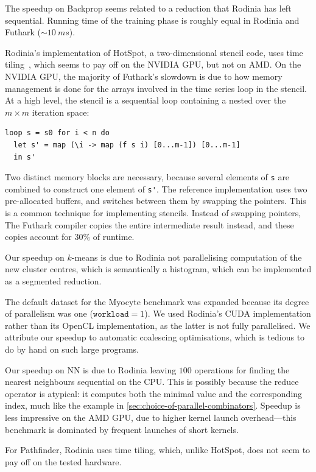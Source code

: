The speedup on Backprop seems related to a reduction that Rodinia has
left sequential.  Running time of the training phase is roughly equal
in Rodinia and Futhark ($\sim10~ms$).

Rodinia's implementation of HotSpot, a two-dimensional stencil code,
uses time tiling~\cite{HexaTiling}, which seems to pay off on the
NVIDIA GPU, but not on AMD.  On the NVIDIA GPU, the majority of
Futhark's slowdown is due to how memory management is done for the
arrays involved in the time series loop in the stencil.  At a high
level, the stencil is a sequential loop containing a nested 
over the $m\times{}m$ iteration space:

\begin{lstlisting}
loop s = s0 for i < n do
  let s' = map (\i -> map (f s i) [0...m-1]) [0...m-1]
  in s'
\end{lstlisting}

Two distinct memory blocks are necessary, because several elements of
\lstinline{s} are combined to construct one element of \lstinline{s'}.
The reference implementation uses two pre-allocated buffers, and
switches between them by swapping the pointers.  This is a common
technique for implementing stencils.  Instead of swapping pointers,
The Futhark compiler copies the entire intermediate result instead,
and these copies account for $30\%$ of runtime.

Our speedup on $k$-means is due to Rodinia not parallelising
computation of the new cluster centres, which is semantically a
histogram, which can be implemented as a segmented reduction.

The default dataset for the Myocyte benchmark was expanded because its
degree of parallelism was one ($\texttt{workload}=1$).  We used
Rodinia's CUDA implementation rather than its OpenCL implementation,
as the latter is not fully parallelised.  We attribute our speedup to
automatic coalescing optimisations, which is tedious to do by hand on
such large programs.

Our speedup on NN is due to Rodinia leaving $100$ 
operations for finding the nearest neighbours sequential on the CPU.
This is possibly because the reduce operator is atypical: it computes
both the minimal value and the corresponding index, much like the
example in \cref{sec:choice-of-parallel-combinators}.  Speedup is less
impressive on the AMD GPU, due to higher kernel launch overhead---this
benchmark is dominated by frequent launches of short kernels.

For Pathfinder, Rodinia uses time tiling, which, unlike HotSpot, does
not seem to pay off on the tested hardware.

